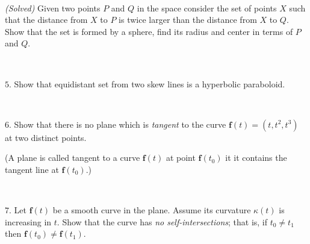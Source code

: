 \documentclass{article}
\def\noi{\noindent}%
\begin{document}
\ 

\noi
{}\textit{(Solved)} Given two points $P$ and $Q$ in the space consider the set of points $X$ such that the distance from $X$ to $P$ is twice larger than the distance from $X$ to $Q$.
Show that the set is formed by a sphere, find its radius and center in terms of $P$ and $Q$.

\ 

\noi
$5$. Show that equidistant set from two skew lines is a hyperbolic paraboloid.

\ 

\noi
$6$. Show that there is no plane which is \emph{tangent} to the curve $\textbf{f}(t)=(t,t^2,t^3)$ at two distinct points. 

(A plane is called tangent to a curve $\textbf{f}(t)$ at point $\textbf{f}(t_0)$ it it contains the tangent line at $\textbf{f}(t_0)$.)

\ 


\noi
$7$. Let $\textbf{f}(t)$ be a smooth curve in the plane.
Assume its curvature $\kappa(t)$ is increasing in $t$.
Show that the curve has \emph{no self-intersections};
that is, if $t_0\ne t_1$ then $\textbf{f}(t_0)\ne\textbf{f}(t_1)$.
\end{document}
